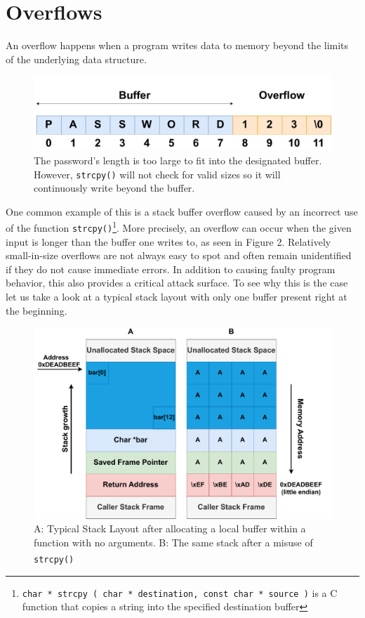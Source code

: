 \documentclass[10pt,twocolumn,a4paper]{article}
\begin{document}
\section{Overflows}\label{sec:Overflows}
An overflow happens when a program writes data to memory beyond the limits of the underlying data structure.
\begin{figure}[h]
\centering
\includegraphics[keepaspectratio,width=\linewidth,trim={0 0 0 1.5cm}]{fig/simpleoverflow}
\caption{The password's length is too large to fit into the designated buffer. However, \texttt{strcpy()} will not check for valid sizes so it will continuously write beyond the buffer.}
\end{figure}\newline
One common example of this is a stack buffer overflow caused by an incorrect use of the function \texttt{strcpy()}\footnote{\texttt{char * strcpy ( char * destination, const char * source )} is a C function that copies a string into the specified destination buffer}.\newline
More precisely, an overflow can occur when the given input is longer than the buffer one writes to, as seen in Figure 2.
Relatively small-in-size overflows are not always easy to spot and often remain unidentified if they do not cause immediate errors.
In addition to causing faulty program behavior, this also provides a critical attack surface.
To see why this is the case let us take a look at a typical stack layout with only one buffer present right at the beginning.
\begin{figure}[h]
	\begin{center}
		\centering
		\includegraphics[keepaspectratio,width=\linewidth,trim={1cm 0 1cm 0}]{fig/Stacks}
		\caption{ A: Typical Stack Layout after allocating a local buffer within a function with no arguments. \newline B: The same stack after a misuse of \texttt{strcpy()}\textsuperscript{\cite{wiki}}}
	\end{center}
\end{figure}
\end{document}
